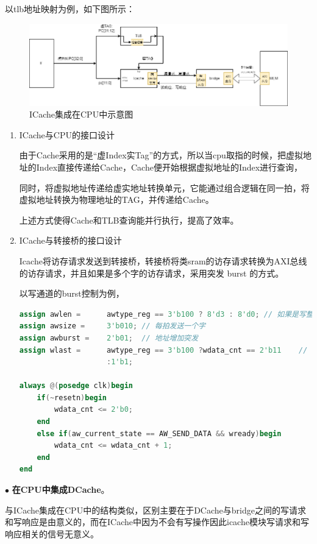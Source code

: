 \documentclass[11pt]{article}
\begin{document}
以tlb地址映射为例，如下图所示：
\begin{figure}[H]
    \centering
    \includegraphics[width=\textwidth]{fig/fig3.png}
    \caption{ICache集成在CPU中示意图}
    \label{fig:3}
\end{figure}
\begin{enumerate}
    \item ICache与CPU的接口设计
    
由于Cache采用的是“虚Index实Tag”的方式，所以当cpu取指的时候，把虚拟地址的Index直接传递给Cache，Cache便开始根据虚拟地址的Index进行查询，

同时，将虚拟地址传递给虚实地址转换单元，它能通过组合逻辑在同一拍，将虚拟地址转换为物理地址的TAG，并传递给Cache。

上述方式使得Cache和TLB查询能并行执行，提高了效率。

    \item ICache与转接桥的接口设计
    
    Icache将访存请求发送到转接桥，转接桥将类sram的访存请求转换为AXI总线的访存请求，并且如果是多个字的访存请求，采用突发 burst 的方式。

    以写通道的burst控制为例，
    \begin{lstlisting}[language=verilog]
assign awlen =      awtype_reg == 3'b100 ? 8'd3 : 8'd0; // 如果是写整个cache行，burst长度为3
assign awsize =     3'b010; // 每拍发送一个字
assign awburst =    2'b01;  // 地址增加突发
assign wlast =      awtype_reg == 3'b100 ?wdata_cnt == 2'b11    // 最后一个字，拉高wlast
                    :1'b1;

always @(posedge clk)begin
    if(~resetn)begin
        wdata_cnt <= 2'b0;
    end
    else if(aw_current_state == AW_SEND_DATA && wready)begin
        wdata_cnt <= wdata_cnt + 1;
    end
end
    \end{lstlisting}

\end{enumerate}

\noindent
$\bullet$
\textbf{在CPU中集成DCache}。

与ICache集成在CPU中的结构类似，区别主要在于DCache与bridge之间的写请求和写响应是由意义的，而在ICache中因为不会有写操作因此icache模块写请求和写响应相关的信号无意义。
\end{document}
